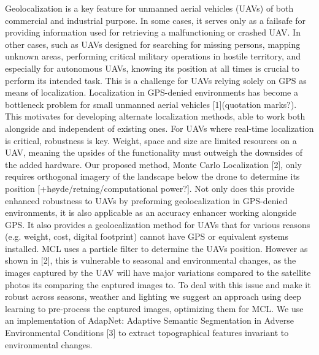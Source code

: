 
\begin{introduction}
Geolocalization is a key feature for unmanned aerial vehicles (UAVs) of both commercial and industrial purpose. In some cases, it serves only as a failsafe for providing information used for retrieving a malfunctioning or crashed UAV. In other cases, such as UAVs designed for searching for missing persons, mapping unknown areas, performing critical military operations in hostile territory, and especially for autonomous UAVs, knowing its position at all times is crucial to perform its intended task. This is a challenge for UAVs relying solely on GPS as means of localization. Localization in GPS-denied environments has become a bottleneck problem for small unmanned aerial vehicles [1](quotation marks?). This motivates for developing alternate localization methods, able to work both alongside and independent of existing ones. For UAVs where real-time localization is critical, robustness is key. Weight, space and size are limited resources on a UAV, meaning the upsides of the functionality must outweigh the downsides of the added hardware. Our proposed method, Monte Carlo Localization [2], only requires orthogonal imagery of the landscape below the drone to determine its position [+høyde/retning/computational power?]. Not only does this provide enhanced robustness to UAVs by preforming geolocalization in GPS-denied environments, it is also applicable as an accuracy enhancer working alongside GPS. It also provides a geolocalization method for UAVs that for various reasons (e.g. weight, cost, digital footprint) cannot have GPS or equivalent systems installed. MCL uses a particle filter to determine the UAVs position. However as shown in [2], this is vulnerable to seasonal and environmental changes, as the images captured by the UAV will have major variations compared to the satellite photos its comparing the captured images to. To deal with this issue and make it robust across seasons, weather and lighting we suggest an approach using deep learning to pre-process the captured images, optimizing them for MCL. We use an implementation of AdapNet: Adaptive Semantic Segmentation in Adverse Environmental Conditions [3] to extract topographical features invariant to environmental changes.


\end{introduction}
